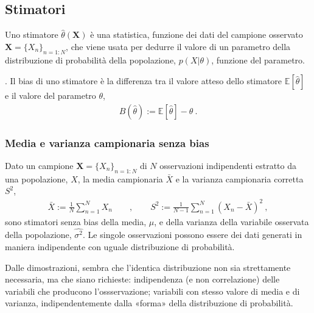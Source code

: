 \documentclass[letterpaper,10pt,italian]{jupyterBook}
\begin{document}
\subsection{Stimatori}
\label{\detokenize{ch/statistics/estimate:stimatori}}\label{\detokenize{ch/statistics/estimate:statistics-hs-inference-estimate-estimators}}
\sphinxAtStartPar
Uno stimatore \(\hat{\theta}(\mathbf{X})\) è una statistica, funzione dei dati del campione osservato \(\mathbf{X} = \{ X_n \}_{n=1:N}\), che viene usata per dedurre il valore di un parametro della distribuzione di probabilità della popolazione, \(p(X|\theta)\), funzione del parametro.

\sphinxAtStartPar
{}. Il bias di uno stimatore è la differenza tra il valore atteso dello stimatore \(\mathbb{E}[ \hat{\theta} ]\) e il valore del parametro \(\theta\),
\begin{equation*}
\begin{split}B(\hat{\theta}) := \mathbb{E}[ \hat{\theta} ] - \theta \ .\end{split}
\end{equation*}

\subsubsection{Media e varianza campionaria senza bias}
\label{\detokenize{ch/statistics/estimate:media-e-varianza-campionaria-senza-bias}}\label{\detokenize{ch/statistics/estimate:statistics-hs-inference-estimate-sample-estimators}}
\sphinxAtStartPar
Dato un campione \(\mathbf{X} = \{ X_n \}_{n=1:N}\) di \(N\) osservazioni indipendenti estratto da una popolazione, \(X\), la media campionaria \(\bar{X}\) e la varianza campionaria corretta \(S^2\),
\begin{equation*}
\begin{split}\bar{X} := \frac{1}{N} \sum_{n = 1}^{N} X_n \qquad , \qquad S^2 := \frac{1}{N-1} \sum_{n=1}^N (X_n - \bar{X})^2 \ ,\end{split}
\end{equation*}
\sphinxAtStartPar
sono stimatori senza bias della media, \(\hat{\mu}\), e della varianza della variabile osservata della popolazione, \(\hat{\sigma^2}\). Le singole osservazioni possono essere dei dati generati in maniera indipendente con uguale distribuzione di probabilità.

\sphinxAtStartPar
{}  Dalle dimostrazioni, sembra che l’identica distribuzione non sia strettamente necessaria, ma che siano richieste: indipendenza (e non correlazione) delle variabili che producono l’ossservazione; variabili con stesso valore di media e di varianza, indipendentemente dalla «forma» della distribuzione di probabilità.
\end{document}

